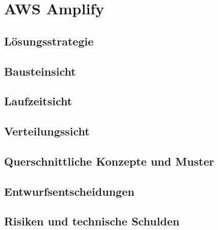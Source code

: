 \section{AWS Amplify}

\subsection{Lösungsstrategie}

\subsection{Bausteinsicht}

\subsection{Laufzeitsicht}

\subsection{Verteilungssicht}

\subsection{Querschnittliche Konzepte und Muster}

\subsection{Entwurfsentscheidungen}

\subsection{Risiken und technische Schulden}